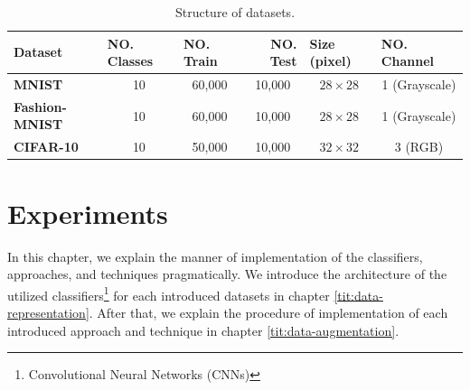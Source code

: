 \begin{table}[]
  \label{dataset_table}
  \begin{tabular}{
      l |
      c
      c
      c
      c
      c}
    \hline
    {\textbf{Dataset}}        & \multicolumn{1}{l}{{\textbf{NO. Classes}}} & \multicolumn{1}{l}{{\textbf{NO. Train}}} & \multicolumn{1}{r}{{\textbf{NO. Test}}} & \multicolumn{1}{l}{{\textbf{Size (pixel)}}} & \multicolumn{1}{l}{{\textbf{NO. Channel}}} \\ \hline
    {\textbf{MNIST}}          & 10                                         & 60,000
                              & 10,000                                     & $28\times28$                             & 1
    (Grayscale)                                                                                                                                                                                                                                            \\
    {\textbf{Fashion-MNIST}} & 10                                         & 60,000
                              & 10,000                                     & $28\times28$
                              & 1 (Grayscale)                                                                                                                                                                                                              \\
    {\textbf{CIFAR-10}}       & 10                                         & 50,000
                              & 10,000                                     & $32\times32$                             & 3
    (RGB)                                                                                                                                                                                                                                                  \\ \hline
  \end{tabular}
  \caption{Structure of datasets.}
\end{table}


\chapter{Experiments}
In this chapter, we explain the manner of implementation of the classifiers, approaches, and
techniques pragmatically. We introduce the architecture of the utilized
classifiers\footnote{Convolutional Neural Networks (CNNs)} for each introduced datasets in chapter
\ref{tit:data-representation}. After that, we explain the procedure of implementation of each
introduced approach and technique in chapter \ref{tit:data-augmentation}.

